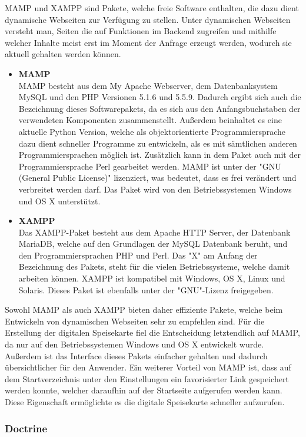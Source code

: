 {MAMP\cite{mamp}} und {XAMPP\cite{xampp}} sind Pakete, welche freie Software enthalten, die dazu dient dynamische Webseiten zur Verfügung zu stellen. Unter dynamischen Webseiten versteht man, Seiten die auf Funktionen im Backend zugreifen und mithilfe welcher Inhalte meist erst im Moment der Anfrage erzeugt werden, wodurch sie aktuell gehalten werden können.
\begin{itemize}
    \item \textbf{MAMP}\\
MAMP besteht aus dem My Apache Webserver, dem Datenbanksystem MySQL und den PHP Versionen 5.1.6 und 5.5.9. Dadurch ergibt sich auch die Bezeichnung dieses Softwarepakets, da es sich aus den Anfangsbuchstaben der verwendeten Komponenten zusammenstellt. Außerdem beinhaltet es eine aktuelle {Python\cite{python}} Version, welche als objektorientierte Programmiersprache dazu dient schneller Programme zu entwickeln, als es mit sämtlichen anderen Programmiersprachen möglich ist. Zusätzlich kann in dem Paket auch mit der Programmiersprache Perl gearbeitet werden. MAMP ist unter der "{GNU\cite{gnu}} (General Public License)" lizenziert, was bedeutet, dass es frei verändert und verbreitet werden darf. Das Paket wird von den Betriebssystemen Windows und OS X unterstützt. 
\pagebreak
    \item \textbf{XAMPP}\\ 
Das XAMPP-Paket besteht aus dem Apache HTTP Server, der Datenbank MariaDB, welche auf den Grundlagen der MySQL Datenbank beruht, und den Programmiersprachen PHP und Perl. Das "X" am Anfang der Bezeichnung des Pakets, steht für die vielen Betriebssysteme, welche damit arbeiten können. XAMPP ist kompatibel mit Windows, OS X, Linux und Solaris. Dieses Paket ist ebenfalls unter der "GNU"-Lizenz freigegeben.
  \end{itemize}  
Sowohl MAMP als auch XAMPP bieten daher effiziente Pakete, welche beim Entwickeln von dynamischen Webseiten sehr zu empfehlen sind. Für die Erstellung der digitalen Speisekarte fiel die Entscheidung letztendlich auf MAMP, da nur auf den Betriebssystemen Windows und OS X entwickelt wurde. Außerdem ist das Interface dieses Pakets einfacher gehalten und dadurch übersichtlicher für den Anwender. Ein weiterer Vorteil von MAMP ist, dass auf dem Startverzeichnis unter den Einstellungen ein favorisierter Link gespeichert werden konnte, welcher daraufhin auf der Startseite aufgerufen werden kann. Diese Eigenschaft ermöglichte es die digitale Speisekarte schneller aufzurufen.

    \subsubsection{Doctrine}

